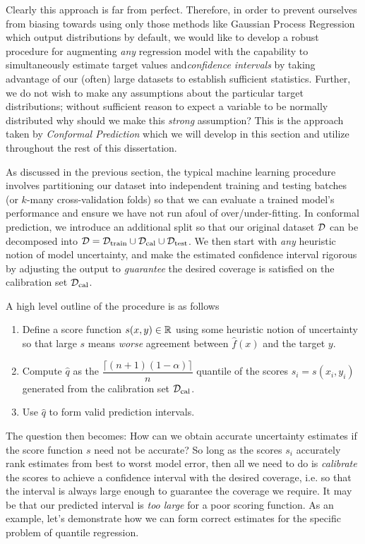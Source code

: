 Clearly this approach is far from perfect. Therefore, in order to prevent
ourselves from biasing towards using only those methods like Gaussian Process
Regression which output distributions by default, we would like to develop a
robust procedure for augmenting \textit{any} regression model with the
capability to simultaneously estimate target values and\textit{confidence
  intervals} by taking advantage of our (often) large datasets to establish
sufficient statistics. Further, we do not wish to make any assumptions about the
particular target distributions; without sufficient reason to expect a variable
to be normally distributed why should we make this \textit{strong} assumption?
This is the approach taken by \textit{Conformal Prediction} which we will
develop in this section and utilize throughout the rest of this dissertation.

As discussed in the previous section, the typical machine learning procedure
involves partitioning our dataset into independent training and testing batches
(or $k$-many cross-validation folds) so that we can evaluate a trained model's
performance and ensure we have not run afoul of over/under-fitting. In conformal
prediction, we introduce an additional split so that our original dataset $\mathcal{D}$
can be decomposed into $\mathcal{D} = \mathcal{D}_{\text{train}}\cup \mathcal{D}_{\text{cal}} \cup
\mathcal{D}_{\text{test}}$. We then start with \textit{any} heuristic notion of model
uncertainty, and make the estimated confidence interval rigorous by adjusting
the output to \textit{guarantee} the desired coverage is satisfied on the
calibration set $\mathcal{D}_{\text{cal}}$.

A high level outline of the procedure is as follows
\begin{enumerate}
\item Define a score function $s(x,y)\in\mathbb{R}$ using some heuristic notion of
  uncertainty so that large $s$ means \textit{worse} agreement between
  $\hat{f}(x)$ and the target $y$.
\item Compute $\hat{q}$ as the $\dfrac{\lceil (n+1)(1-\alpha) \rceil}{n}$
  quantile of the scores $s_i = s(x_i, y_i)$ generated from the calibration set
  $\mathcal{D}_{\text{cal}}$.
\item Use $\hat{q}$ to form valid prediction intervals.
\end{enumerate}

The question then becomes: How can we obtain accurate uncertainty estimates if
the score function $s$ need not be accurate? So long as the scores $s_i$
accurately rank estimates from best to worst model error, then all we need to do
is \textit{calibrate} the scores to achieve a confidence interval with the
desired coverage, i.e. so that the interval is always large enough to guarantee
the coverage we require. It may be that our predicted interval is \textit{too
  large} for a poor scoring function. As an example, let's demonstrate how we
can form correct estimates for the specific problem of quantile regression.


